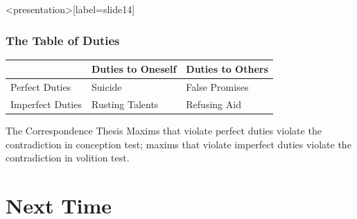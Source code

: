 \begin{frame}<presentation>[label=slide14]
    \frametitle{The Table of Duties}
        \begin{tabular}{lll}
            \hline
            & \alert{Duties to Oneself} & \alert{Duties to Others}\\
            \hline
            \alert{Perfect Duties} & Suicide & False Promises\\
            \hline
            \alert{Imperfect Duties} & Rusting Talents & Refusing Aid\\
            \hline
        \end{tabular}
        
        \begin{block}{The Correspondence Thesis}
        	Maxims that violate perfect duties violate the contradiction in conception test; maxims that violate imperfect duties violate the contradiction in volition test.
        \end{block}
        
\end{frame}


\section*{Next Time}\label{sec:next_time} %



